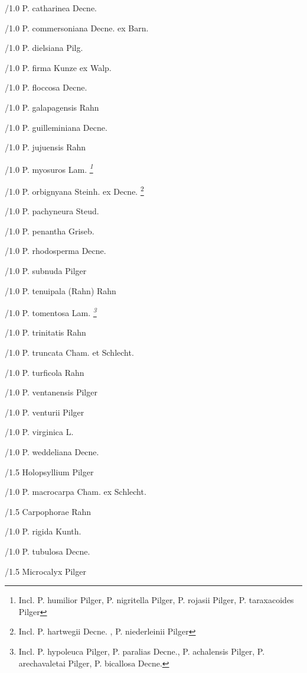\documentclass{article}
\begin{document}
\begin{classif}{1.0}
        /1.0 {P. catharinea} Decne.

        /1.0 {P. commersoniana} Decne. ex Barn.

        /1.0 {P. dielsiana} Pilg.

        /1.0 {P. firma} Kunze ex Walp.

        /1.0 {P. floccosa} Decne.

        /1.0 {P. galapagensis} Rahn

        /1.0 {P. guilleminiana} Decne.

        /1.0 {P. jujuensis} Rahn

        /1.0 {P. myosuros} Lam. \sl \footnote{Incl. \KURN P.
        humilior Pilger, \KURN P. nigritella Pilger, \KURN P.
        rojasii Pilger, \KURN P. taraxacoides Pilger}

        /1.0 {P. orbignyana} Steinh. ex Decne. \footnote{Incl.
        \KURN P. hartwegii Decne. \Pp, \KURN P. niederleinii
        Pilger}

        /1.0 {P. pachyneura} Steud.

        /1.0 {P. penantha} Griseb.

        /1.0 {P. rhodosperma} Decne.

        /1.0 {P. subnuda} Pilger

        /1.0 {P. tenuipala} (Rahn) Rahn

        /1.0 {P. tomentosa} Lam. \sl \footnote{Incl. \KURN P.
        hypoleuca Pilger, \KURN P. paralias Decne., \KURN P.
        achalensis Pilger, \KURN P. arechavaletai Pilger, \KURN
        P. bicallosa Decne. \Pp}

        /1.0 {P. trinitatis} Rahn

        /1.0 {P. truncata} Cham. et Schlecht.

        /1.0 {P. turficola} Rahn

        /1.0 {P. ventanensis} Pilger

        /1.0 {P. venturii} Pilger

        /1.0 {P. virginica} L.

        /1.0 {P. weddeliana} Decne.

/1.5 Holopsyllium Pilger

        /1.0 {P. macrocarpa} Cham. ex Schlecht.

/1.5 Carpophorae Rahn

        /1.0 {P. rigida} Kunth.

        /1.0 {P. tubulosa} Decne.

/1.5 Microcalyx Pilger


\end{classif}
\end{document}

